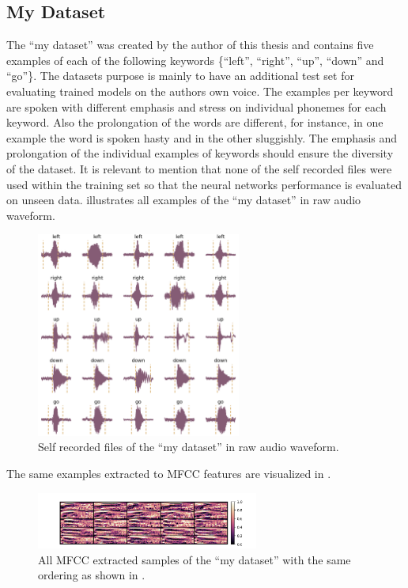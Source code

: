 
\subsection{My Dataset}\label{sec:exp_dataset_my}
The \enquote{my dataset} was created by the author of this thesis and contains five examples of each of the following keywords \{\enquote{left}, \enquote{right}, \enquote{up}, \enquote{down} and \enquote{go}\}.
The datasets purpose is mainly to have an additional test set for evaluating trained models on the authors own voice.
The examples per keyword are spoken with different emphasis and stress on individual phonemes for each keyword.
Also the prolongation of the words are different, for instance, in one example the word is spoken hasty and in the other sluggishly.
The emphasis and prolongation of the individual examples of keywords should ensure the diversity of the dataset.
It is relevant to mention that none of the self recorded files were used within the training set so that the neural networks performance is evaluated on unseen data.
 illustrates all examples of the \enquote{my dataset} in raw audio waveform.
\begin{figure}[!ht]
  \centering
    \includegraphics[width=0.6\textwidth]{./5_exp/figs/exp_dataset_my_wav_grid.png}
  \caption{Self recorded files of the \enquote{my dataset} in raw audio waveform.}
  \label{fig:exp_dataset_my_wav_grid}
\end{figure}
\FloatBarrier
\noindent
The same examples extracted to MFCC features are visualized in .
\begin{figure}[!ht]
  \centering
    \includegraphics[width=0.65\textwidth]{./5_exp/figs/exp_dataset_my_mfcc.png}
  \caption{All MFCC extracted samples of the \enquote{my dataset} with the same ordering as shown in .}
  \label{fig:exp_dataset_my_mfcc}
\end{figure}
